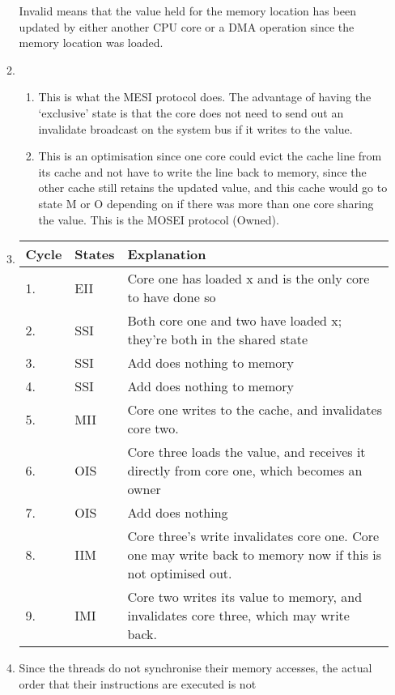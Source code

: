 \documentclass{report}
\begin{document}
\begin{enumerate}
\begin{enumerate}
    Invalid means that the value held for the memory location has been
    updated by either another CPU core or a DMA operation since the
    memory location was loaded.
  \item
    \begin{enumerate}
      \item This is what the MESI protocol does. The advantage of
        having the `exclusive' state is that the core does not need to
        send out an invalidate broadcast on the system bus if it
        writes to the value.
      \item This is an optimisation since one core could evict the
        cache line from its cache and not have to write the line back
        to memory, since the other cache still retains the updated
        value, and this cache would go to state M or O depending on if
        there was more than one core sharing the value. This is the
        MOSEI protocol (Owned).
    \end{enumerate}
  \item
    \begin{tabularx}{\textwidth}{llX}
      Cycle & States & Explanation\\ \hline
      1.    & EII    & Core one has loaded x and is the only core to
      have done so\\
      2.    & SSI    & Both core one and two have loaded x; they're
      both in the shared state\\
      3.    & SSI    & Add does nothing to memory\\
      4.    & SSI    & Add does nothing to memory\\
      5.    & MII    & Core one writes to the cache, and invalidates
      core two.\\
      6.    & OIS    & Core three loads the value, and receives it
      directly from core one, which becomes an owner\\
      7.    & OIS    & Add does nothing\\
      8.    & IIM    & Core three's write invalidates core one. Core
      one may write back to memory now if this is not optimised out.\\
      9.    & IMI    & Core two writes its value to memory, and
      invalidates core three, which may write back.\\
    \end{tabularx}
  \item Since the threads do not synchronise their memory accesses,
    the actual order that their instructions are executed is not

\end{enumerate}
\end{enumerate}
\end{document}

